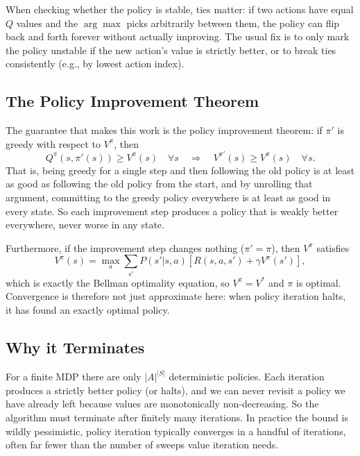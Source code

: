 \documentclass[conference]{IEEEtran}
\begin{document}
When checking whether the policy is stable, ties matter: if two actions have equal $Q$ values and the $\arg\max$ picks arbitrarily between them, the policy can flip back and forth forever without actually improving. The usual fix is to only mark the policy unstable if the new action's value is strictly better, or to break ties consistently (e.g., by lowest action index).

\subsection*{The Policy Improvement Theorem}
The guarantee that makes this work is the policy improvement theorem: if $\pi'$ is greedy with respect to $V^\pi$, then
\[
    Q^\pi(s, \pi'(s)) \ge V^\pi(s) \quad \forall s \quad \Longrightarrow \quad V^{\pi'}(s) \ge V^\pi(s) \quad \forall s.
\]
That is, being greedy for a single step and then following the old policy is at least as good as following the old policy from the start, and by unrolling that argument, committing to the greedy policy everywhere is at least as good in every state. So each improvement step produces a policy that is weakly better everywhere, never worse in any state.

Furthermore, if the improvement step changes nothing ($\pi' = \pi$), then $V^\pi$ satisfies
\[
    V^\pi(s) = \max_a \sum_{s'} P(s'|s,a)[R(s,a,s') + \gamma V^\pi(s')],
\]
which is exactly the Bellman optimality equation, so $V^\pi = V^*$ and $\pi$ is optimal. Convergence is therefore not just approximate here: when policy iteration halts, it has found an exactly optimal policy.

\subsection*{Why it Terminates}
For a finite MDP there are only $|A|^{|S|}$ deterministic policies. Each iteration produces a strictly better policy (or halts), and we can never revisit a policy we have already left because values are monotonically non-decreasing. So the algorithm must terminate after finitely many iterations. In practice the bound is wildly pessimistic, policy iteration typically converges in a handful of iterations, often far fewer than the number of sweeps value iteration needs.
\end{document}
